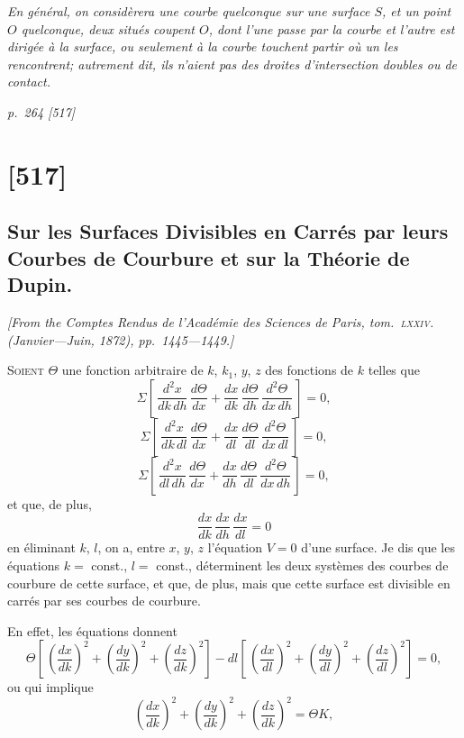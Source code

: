 \documentclass[11pt,a4paper]{book}
\begin{document}
\bigskip
\textit{En g\'en\'eral, on consid\`erera une courbe quelconque sur une surface $S$, et un point $O$ quelconque,
deux situ\'es coupent $O$, dont l'une passe par la courbe et l'autre est dirig\'ee \`a la surface, ou seulement \`a la courbe touchent
partir o\`u un les rencontrent; autrement dit, ils n'aient pas des droites d'intersection doubles ou de contact.}

\clearpage

\bigskip
\textit{p.~264 [517]}
\smallskip

\section{[517]}
\subsection{Sur les Surfaces Divisibles en Carr\'es par leurs Courbes de Courbure et sur la Th\'eorie de Dupin.}

\begin{center}
\textit{[From the \textit{Comptes Rendus de l'Acad\'emie des Sciences de Paris}, tom.~\textsc{lxxiv}. (Janvier---Juin, 1872), pp.~1445---1449.]}
\end{center}

\textsc{Soient} $\Theta$ une fonction arbitraire de $k$, $k_1$, $y$, $z$ des fonctions de $k$ telles que
\[
\Sigma\!\left[\,\frac{d^2x}{dk\,dh}\,\frac{d\Theta}{dx} + \frac{dx}{dk}\,\frac{d\Theta}{dh}\,\frac{d^2\Theta}{dx\,dh}\,\right] = 0,
\]
\[
\Sigma\!\left[\,\frac{d^2x}{dk\,dl}\,\frac{d\Theta}{dx} + \frac{dx}{dl}\,\frac{d\Theta}{dl}\,\frac{d^2\Theta}{dx\,dl}\,\right] = 0,
\]
\[
\Sigma\!\left[\,\frac{d^2x}{dl\,dh}\,\frac{d\Theta}{dx} + \frac{dx}{dh}\,\frac{d\Theta}{dl}\,\frac{d^2\Theta}{dx\,dh}\,\right] = 0,
\]
et que, de plus,
\[
\frac{dx}{dk}\,\frac{dx}{dh}\,\frac{dx}{dl} = 0
\]
en \'eliminant $k$, $l$, on a, entre $x$, $y$, $z$ l'\'equation $V = 0$ d'une surface.  Je dis que les
\'equations $k = $ const., $l = $ const., d\'eterminent les deux syst\`emes des courbes de courbure
de cette surface, et que, de plus, mais que cette surface est divisible en carr\'es par ses courbes
de courbure.

En effet, les \'equations donnent
\[
\Theta\!\left[\,\!\left(\frac{dx}{dk}\right)^2 + \left(\frac{dy}{dk}\right)^2 + \left(\frac{dz}{dk}\right)^2\!\right] - dl\!\left[\,\!\left(\frac{dx}{dl}\right)^2 + \left(\frac{dy}{dl}\right)^2 + \left(\frac{dz}{dl}\right)^2\!\right] = 0,
\]
ou qui implique
\[
\left(\frac{dx}{dk}\right)^2 + \left(\frac{dy}{dk}\right)^2 + \left(\frac{dz}{dk}\right)^2 = \Theta K,
\]
\end{document}
